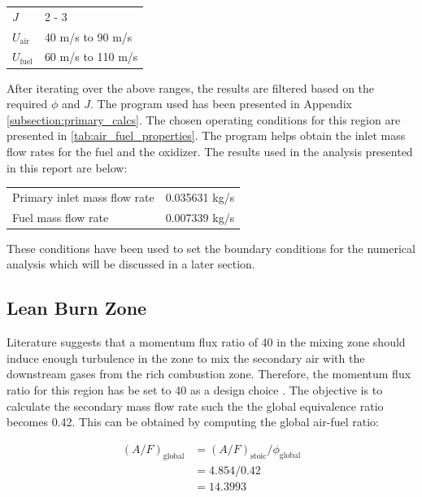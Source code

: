 \begin{table}[H]
\centering
    \begin{tabular}{ll}
         $J$              &  2 - 3 \\
         $U_{\text{air}}$ &  40 m/s to 90 m/s \\
        $U_{\text{fuel}}$ &  60 m/s to 110 m/s \\
    \end{tabular}
\end{table}

After iterating over the above ranges, the results are filtered based on the required $\phi$ and $J$. The program used has been presented in Appendix \ref{subsection:primary_calcs}.
The chosen operating conditions for this region are presented in \autoref{tab:air_fuel_properties}. The program helps obtain the inlet mass flow rates for the fuel and the oxidizer. The results used in the analysis presented in this report are below:

\begin{table}[H]
    \centering
    \begin{tabular}{ll}
         Primary inlet mass flow rate &  0.035631 kg/s\\
         Fuel mass flow rate &  0.007339 kg/s
    \end{tabular}
\end{table}


These conditions have been used to set the boundary conditions for the numerical analysis which will be discussed in a later section.


\subsection{Lean Burn Zone}

Literature suggests that a momentum flux ratio of 40 in the mixing zone should induce enough turbulence in the zone to mix the secondary air with the downstream gases from the rich combustion zone. Therefore, the momentum flux ratio for this region has be set to 40 as a design choice \cite{Talpallikar1992, Lefebvre2010}. The objective is to calculate the secondary mass flow rate such the the global equivalence ratio becomes 0.42. This can be obtained by computing the global air-fuel ratio:

\begin{equation}
\begin{split}
        \left( A/F \right)_{\text{global}} & = \left( A/F \right)_{\text{stoic}} / \phi_{\text{global}} \\
        & = 4.854 / 0.42 \\
        & = 14.3993
\end{split}
\end{equation}


